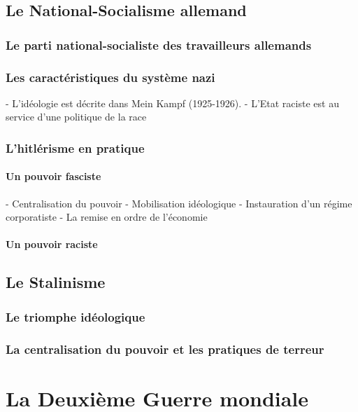 \documentclass[12pt]{report}
\begin{document}
\section{Le National-Socialisme allemand}

\subsection{Le parti national-socialiste des travailleurs allemands}

\subsection{Les caractéristiques du système nazi}

- L’idéologie est décrite dans Mein Kampf (1925-1926).
- L’Etat raciste est au service d’une politique de la race

\subsection{L'hitlérisme en pratique}

\subsubsection{Un pouvoir fasciste}

- Centralisation du pouvoir
- Mobilisation idéologique
- Instauration d’un régime corporatiste
- La remise en ordre de l’économie

\subsubsection{Un pouvoir raciste}

\section{Le Stalinisme}

\subsection{Le triomphe idéologique}

\subsection{La centralisation du pouvoir et les pratiques de terreur}



\chapter{La Deuxième Guerre mondiale}
\end{document}
